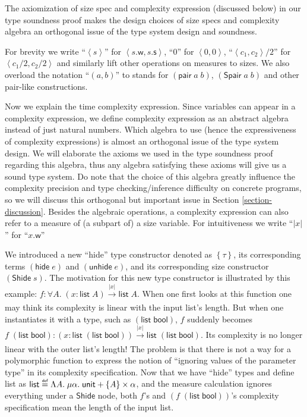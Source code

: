 \documentclass[preprint]{sigplanconf}
\newcommand{\thide}[1]{\left \{ #1 \right \}}
\newcommand{\arrow}[4]{#1\xrightarrow[#3]{#2}#4}
\newcommand{\symhide}{\mathsf{hide\;}}
\newcommand{\symShide}{\mathsf{Shide}}
\newcommand{\symunhide}{\mathsf{unhide\;}}
\newcommand{\sympair}{\mathsf{pair}}
\newcommand{\symunit}{\mathsf{unit}}
\newcommand{\symlist}{\mathsf{list}}
\newcommand{\symbool}{\mathsf{bool}}
\newcommand{\intro}[2]{(#1 : #2)}
\newcommand{\symSpair}{\mathsf{Spair}}
\newcommand{\symwork}{\mathsf{w}}
\newcommand{\symspan}{\mathsf{s}}
\newcommand\defeq{\mathrel{\overset{\makebox[0pt]{\mbox{\normalfont\tiny\sffamily def}}}{=}}}
\newcommand{\Sstats}[1]{\left \langle #1 \right \rangle}
\begin{document}
The axiomization of size spec and complexity expression (discussed below) in our type soundness proof makes the design choices of size specs and complexity algebra an orthogonal issue of the type system design and soundness.

For brevity we write ``$\Sstats{s}$'' for $\Sstats{s.\symwork,s.\symspan}$, ``0'' for $\Sstats{0,0}$, ``$\Sstats{c_1,c_2}/2$'' for $\Sstats{c_1/2,c_2/2}$ and similarly lift other operations on measures to sizes. We also overload the notation ``$(a,b)$'' to stands for $(\sympair\;a\;b)$, $(\symSpair\;a\;b)$ and other pair-like constructions.

Now we explain the time complexity expression. Since variables can appear in a complexity expression, we define complexity expression as an abstract algebra instead of just natural numbers. Which algebra to use (hence the expressiveness of complexity expressions) is almost an orthogonal issue of the type system design. We will elaborate the axioms we used in the type soundness proof regarding this algebra, thus any algebra satisfying these axioms will give us a sound type system. Do note that the choice of this algebra greatly influence the complexity precision and type checking/inference difficulty on concrete programs, so we will discuss this orthogonal but important issue in Section \ref{section-discussion}. Besides the algebraic operations, a complexity expression can also refer to a measure of (a subpart of) a size variable. For intuitiveness we write ``$|x|$'' for ``$x.\symwork$''

We introduced a new ``hide'' type constructor denoted as $\thide{\tau}$, its corresponding terms $(\symhide e)$ and $(\symunhide e)$, and its corresponding size constructor $(\symShide\;s)$. The motivation for this new type constructor is illustrated by this example: $f:\forall A.\;\arrow{\intro{x}{\symlist\;A}}{|x|}{}{\symlist\;A}$. When one first looks at this function one may think its complexity is linear with the input list's length. But when one instantiates it with a type, such as $(\symlist\;\symbool)$, $f$ suddenly becomes $f\;(\symlist\;\symbool):\arrow{\intro{x}{\symlist\;(\symlist\;\symbool)}}{|x|}{}{\symlist\;(\symlist\;\symbool)}$. Its complexity is no longer linear with the outer list's length! The problem is that there is not a way for a polymorphic function to express the notion of ``ignoring values of the parameter type'' in its complexity specification. Now that we have ``hide'' types and define list as $\symlist \defeq \Lambda A.\;\mu \alpha.\;\symunit + \thide{A} \times \alpha$, and the measure calculation ignores everything under a $\symShide$ node, both $f$'s and $(f\;(\symlist\;\symbool))$'s complexity specification mean the length of the input list.
\end{document}
